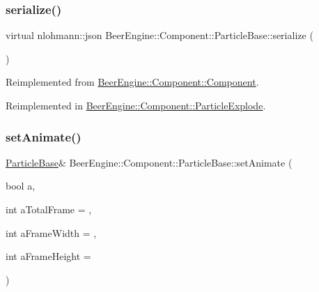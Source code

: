 \subsubsection{\texorpdfstring{serialize()}{serialize()}}
{\footnotesize\ttfamily virtual nlohmann\+::json Beer\+Engine\+::\+Component\+::\+Particle\+Base\+::serialize (\begin{DoxyParamCaption}{ }\end{DoxyParamCaption})\hspace{0.3cm}{\ttfamily [virtual]}}



Reimplemented from \mbox{\hyperlink{class_beer_engine_1_1_component_1_1_component_a4d82d8a6b22b93514e0585fa4073041f}{Beer\+Engine\+::\+Component\+::\+Component}}.



Reimplemented in \mbox{\hyperlink{class_beer_engine_1_1_component_1_1_particle_explode_a194d098568efe69f8e8b62eec5863ae6}{Beer\+Engine\+::\+Component\+::\+Particle\+Explode}}.

\mbox{\label{class_beer_engine_1_1_component_1_1_particle_base_adfa9cb8fefe1f3ffee2f67ac4bf2f7d3}} 
\subsubsection{\texorpdfstring{set\+Animate()}{setAnimate()}}
{\footnotesize\ttfamily \mbox{\hyperlink{class_beer_engine_1_1_component_1_1_particle_base}{Particle\+Base}}\& Beer\+Engine\+::\+Component\+::\+Particle\+Base\+::set\+Animate (\begin{DoxyParamCaption}\item[{bool}]{a,  }\item[{int}]{a\+Total\+Frame = {},  }\item[{int}]{a\+Frame\+Width = {},  }\item[{int}]{a\+Frame\+Height = {} }\end{DoxyParamCaption})}

\mbox{\label{class_beer_engine_1_1_component_1_1_particle_base_a9217363eb47c65426dfbee8c03376043}} 

